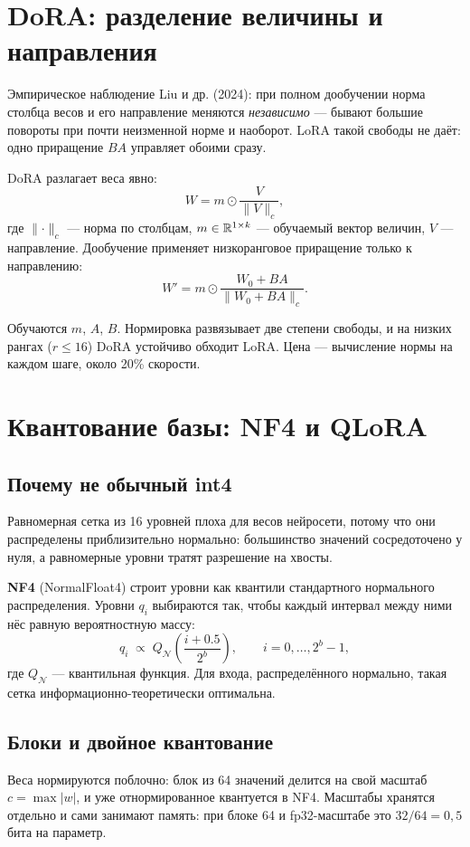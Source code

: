 \documentclass[11pt,a4paper]{article}
\begin{document}
\section{DoRA: разделение величины и направления}

Эмпирическое наблюдение Liu и др. (2024): при полном дообучении норма
столбца весов и его направление меняются \emph{независимо} — бывают
большие повороты при почти неизменной норме и наоборот. LoRA такой
свободы не даёт: одно приращение $BA$ управляет обоими сразу.

DoRA разлагает веса явно:
\[
W = m \odot \frac{V}{\lVert V \rVert_c},
\]
где $\lVert\cdot\rVert_c$ — норма по столбцам, $m \in \mathbb{R}^{1\times k}$ —
обучаемый вектор величин, $V$ — направление. Дообучение применяет
низкоранговое приращение только к направлению:
\[
W' = m \odot \frac{W_0 + BA}{\lVert W_0 + BA \rVert_c}.
\]

Обучаются $m$, $A$, $B$. Нормировка развязывает две степени свободы,
и на низких рангах ($r \le 16$) DoRA устойчиво обходит LoRA. Цена —
вычисление нормы на каждом шаге, около 20\% скорости.

\section{Квантование базы: NF4 и QLoRA}

\subsection{Почему не обычный int4}

Равномерная сетка из 16 уровней плоха для весов нейросети, потому что
они распределены приблизительно нормально: большинство значений
сосредоточено у нуля, а равномерные уровни тратят разрешение на хвосты.

\textbf{NF4} (NormalFloat4) строит уровни как квантили стандартного
нормального распределения. Уровни $q_i$ выбираются так, чтобы каждый
интервал между ними нёс равную вероятностную массу:
\[
q_i \;\propto\; Q_{\mathcal{N}}\!\left(\frac{i + 0.5}{2^b}\right),
\qquad i = 0,\dots,2^b-1,
\]
где $Q_{\mathcal{N}}$ — квантильная функция. Для входа, распределённого
нормально, такая сетка информационно-теоретически оптимальна.

\subsection{Блоки и двойное квантование}

Веса нормируются поблочно: блок из 64 значений делится на свой масштаб
$c = \max|w|$, и уже отнормированное квантуется в NF4. Масштабы
хранятся отдельно и сами занимают память: при блоке 64 и fp32-масштабе
это $32/64 = 0{,}5$ бита на параметр.
\end{document}
